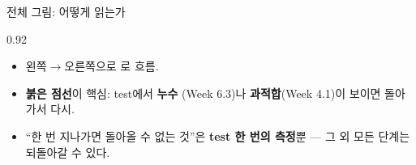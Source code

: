 \begin{frame}{전체 그림: 어떻게 읽는가}
\begin{center}\begin{varwidth}{0.92\textwidth}
  \begin{itemize}
    \item 왼쪽$\to$오른쪽으로  로 흐름.
    \item \textbf{붉은 점선}이 핵심: test에서 \textbf{누수}
      (Week 6.3)나 \textbf{과적합}(Week 4.1)이 보이면
      돌아가서 다시.
    \item ``한 번 지나가면 돌아올 수 없는 것''은
      \textbf{test 한 번의 측정}뿐 --- 그 외 모든 단계는
      되돌아갈 수 있다.
  \end{itemize}
\end{varwidth}\end{center}
\end{frame}
